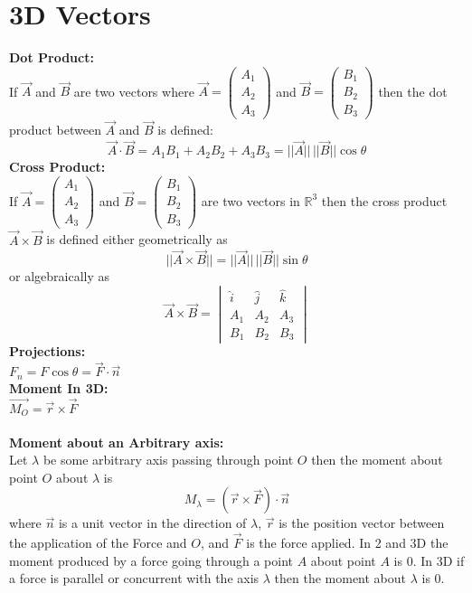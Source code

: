 \documentclass[14pt]{article}
\begin{document}
    \section{3D Vectors}
    \textbf{Dot Product:}\\
    If $\vec{A}$ and $\vec{B}$ are two vectors where $\vec{A}=\begin{pmatrix}A_1\\A_2\\A_3 \end{pmatrix}$ and $\vec{B}=\begin{pmatrix}B_1\\B_2\\B_3\end{pmatrix}$ then the dot product between $\vec{A}$ and $\vec{B}$ is defined:
    $$\vec{A}\cdot \vec{B}=A_1B_1+A_2B_2+A_3B_3=||\vec{A}||\,||\vec{B}||\cos\theta$$
    \textbf{Cross Product:}\\
    If $\vec{A}=\begin{pmatrix}A_1\\A_2\\A_3 \end{pmatrix}$ and $\vec{B}=\begin{pmatrix}B_1\\B_2\\B_3\end{pmatrix}$ are two vectors in $\mathbb{R}^3$ then the cross product $\vec{A}\times\vec{B}$ is defined either geometrically as $$||\vec{A}\times\vec{B}||=||\vec{A}||\,||\vec{B}||\sin\theta$$
    or algebraically as $$\vec{A}\times\vec{B}=\begin{vmatrix}
        \hat{i} & \hat{j} &\hat{k}\\
        A_1 & A_2 & A_3\\
        B_1 & B_2 & B_3
    \end{vmatrix}$$
    \textbf{Projections:}\\
    $F_n=F\cos\theta=\vec{F}\cdot\vec{n}$\\
    \textbf{Moment In 3D: }\\
    $\vec{M_O}=\vec{r}\times\vec{F}$\\\\
    \textbf{Moment about an Arbitrary axis:}\\
    Let $\lambda$ be some arbitrary axis passing through point $O$ then the moment about point $O$ about $\lambda$ is 
    $$M_\lambda=(\vec{r}\times\vec{F})\cdot\vec{n}$$
    where $\vec{n}$ is a unit vector in the direction of $\lambda$, $\vec{r}$ is the position vector between the application of the Force and $O$, and $\vec{F}$ is the force applied. In 2 and 3D the moment produced by a force going through a point $A$ about point $A$ is $0$. In 3D if a force is parallel or concurrent with the axis $\lambda$ then the moment about $\lambda$ is $0$.\\\\
\end{document}
